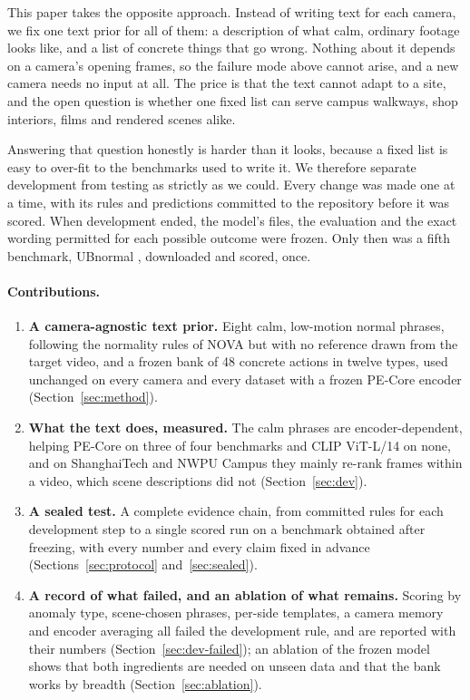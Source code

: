 \documentclass[a4paper,fleqn]{cas-sc}
\begin{document}
This paper takes the opposite approach. Instead of writing text for each camera, we
fix one text prior for all of them: a description of what calm, ordinary footage
looks like, and a list of concrete things that go wrong. Nothing about it depends on
a camera's opening frames, so the failure mode above cannot arise, and a new camera
needs no input at all. The price is that the text cannot adapt to a site, and the
open question is whether one fixed list can serve campus walkways, shop interiors,
films and rendered scenes alike.

Answering that question honestly is harder than it looks, because a fixed list is
easy to over-fit to the benchmarks used to write it. We therefore separate
development from testing as strictly as we could. Every change was made one at a
time, with its rules and predictions committed to the repository before it was
scored. When development ended, the model's files, the evaluation and the exact
wording permitted for each possible outcome were frozen. Only then was a fifth
benchmark, UBnormal \citep{acsintoae2022ubnormal}, downloaded and scored, once.

\paragraph{Contributions.}
\begin{enumerate}[(1)]
  \item \textbf{A camera-agnostic text prior.} Eight calm, low-motion normal phrases,
        following the normality rules of NOVA \citep{yin2026nova} but with no
        reference drawn from the target video, and a frozen bank of 48 concrete
        actions in twelve types, used unchanged on every camera and every dataset with
        a frozen PE-Core encoder \citep{bolya2025pe} (Section~\ref{sec:method}).
  \item \textbf{What the text does, measured.} The calm phrases are
        encoder-dependent, helping PE-Core on three of four benchmarks and CLIP
        ViT-L/14 on none, and on ShanghaiTech and NWPU Campus they mainly re-rank
        frames within a video, which scene descriptions did not
        (Section~\ref{sec:dev}).
  \item \textbf{A sealed test.} A complete evidence chain, from committed rules for
        each development step to a single scored run on a benchmark obtained after
        freezing, with every number and every claim fixed in advance
        (Sections~\ref{sec:protocol} and~\ref{sec:sealed}).
  \item \textbf{A record of what failed, and an ablation of what remains.} Scoring by
        anomaly type, scene-chosen phrases, per-side templates, a camera memory and
        encoder averaging all failed the development rule, and are reported with their
        numbers (Section~\ref{sec:dev-failed}); an ablation of the frozen model shows
        that both ingredients are needed on unseen data and that the bank works by
        breadth (Section~\ref{sec:ablation}).
\end{enumerate}
\end{document}
